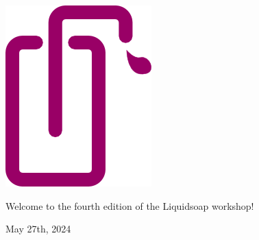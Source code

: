 \documentclass[aspectratio=169]{beamer}
\begin{document}
\begin{frame}
  \vspace{1cm}
  \begin{center}
    \includegraphics[scale=.7]{logo}

    \vspace{1cm}

    {\Large
      Welcome to the fourth edition of the Liquidsoap workshop!
    }

    \bigskip

    May 27th, 2024
  \end{center}
\end{frame}
\end{document}

